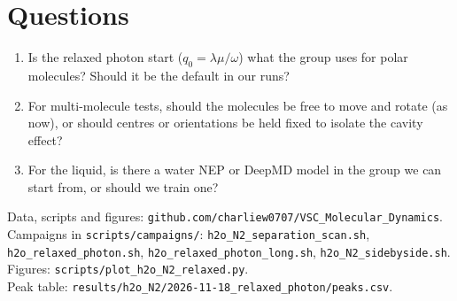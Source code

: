 \documentclass[11pt]{article}
\begin{document}
\section*{Questions}

\begin{enumerate}
  \item Is the relaxed photon start ($q_0=\lambda\mu/\omega$) what the group uses for polar
        molecules? Should it be the default in our runs?
  \item For multi-molecule tests, should the molecules be free to move and rotate (as
        now), or should centres or orientations be held fixed to isolate the cavity effect?
  \item For the liquid, is there a water NEP or DeepMD model in the group we can start from,
        or should we train one?
\end{enumerate}

\vfill
{\small\raggedright Data, scripts and figures: \texttt{github.com/charliew0707/VSC\_Molecular\_Dynamics}.\\
Campaigns in \texttt{scripts/campaigns/}: \texttt{h2o\_N2\_separation\_scan.sh},
\texttt{h2o\_relaxed\_photon.sh}, \texttt{h2o\_relaxed\_photon\_long.sh},
\texttt{h2o\_N2\_sidebyside.sh}.\\
Figures: \texttt{scripts/plot\_h2o\_N2\_relaxed.py}.\\
Peak table: \texttt{results/h2o\_N2/2026-11-18\_relaxed\_photon/peaks.csv}.\par}
\end{document}
